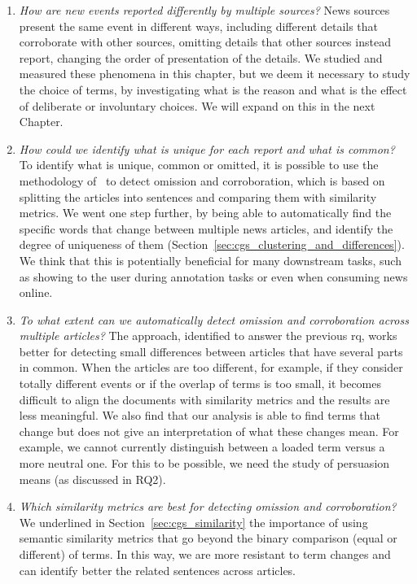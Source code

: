 \begin{enumerate}[label={\textbf{RQ1.\arabic*:}},leftmargin=2cm]
    \item \emph{How are new events reported differently by multiple sources?} News sources present the same event in different ways, including different details that corroborate with other sources, omitting details that other sources instead report, changing the order of presentation of the details. We studied and measured these phenomena in this chapter, but we deem it necessary to study the choice of terms, by investigating what is the reason and what is the effect of deliberate or involuntary choices. We will expand on this in the next Chapter.
    \item \emph{How could we identify what is unique for each report and what is common?} To identify what is unique, common or omitted, it is possible to use the methodology of~\citet{bountouridis2018explaining} to detect omission and corroboration, %
    which is based on splitting the articles into sentences and comparing them with similarity metrics.
    We went one step further, by being able to automatically find the specific words that change between multiple news articles, and identify the degree of uniqueness of them (Section~\ref{sec:cgs_clustering_and_differences}). We think that this is potentially beneficial for many downstream tasks, such as showing to the user during annotation tasks or even when consuming news online.
    \item \emph{To what extent can we automatically detect omission and corroboration across multiple articles?} The approach, identified to answer the previous \acrshort{rq}, works better for detecting small differences between articles that have several parts in common. When the articles are too different, for example, if they consider totally different events or if the overlap of terms is too small, it becomes difficult to align the documents with similarity metrics and the results are less meaningful. We also find that our analysis is able to find terms that change but does not give an interpretation of what these changes mean. For example, we cannot currently distinguish between a loaded term versus a more neutral one. For this to be possible, we need the study of persuasion means (as discussed in RQ2).
    \item \emph{Which similarity metrics are best for detecting omission and corroboration?} We underlined in Section~\ref{sec:cgs_similarity} the importance of using semantic similarity metrics that go beyond the binary comparison (equal or different) of terms. In this way, we are more resistant to term changes and can identify better the related sentences across articles.
\end{enumerate}

